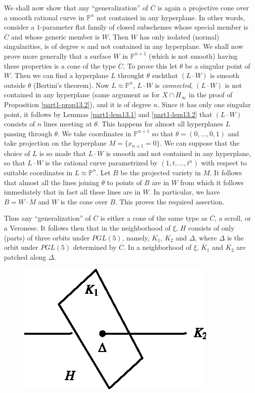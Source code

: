 {We shall now show that any ``generalization'' of $\overline{C}$ is again a
projective cone over a smooth rational curve in $\mathbb{P}^{n}$ not
contained in any hyperplane. In other words, consider a $1$-parameter
flat family of closed subschemes whose special member is
$\overline{C}$ and whose generic member is $W$. Then $W$ has only
isolated (normal) singularities, is of degree $n$ and not contained in
any hyperplane. We shall now prove more generally that a surface $W$
in $\mathbb{P}^{n+1}$ (which is not smooth) having these properties is
a cone of the type $\overline{C}$. To prove this let $\theta$ be a
singular point of $W$. Then we can find a hyperplane $L$ throught
$\theta$ such\pageoriginale that $(L\cdot W)$ is smooth outside
$\theta$ (Bertini's theorem). Now $L\approx \mathbb{P}^{n}$, $L\cdot
W$ is {\em connected}, $(L\cdot W)$ is not contained in any hyperplane
(same argument as for $X\cap H_{\infty}$ in the proof of Proposition
\ref{part1-prop13.2}), and it is of degree $n$. Since it has only one
singular point, it follows by Lemmas \ref{part1-lem13.1} and
\ref{part1-lem13.2} that $(L\cdot W)$ consists of $n$ lines meeting at
$\theta$. This happens for almost all hyperplanes $L$ passing through
$\theta$. We take coordinates in $\mathbb{P}^{n+1}$ so that
$\theta=(0,\ldots,0,1)$ and take projection on the hyperplane
$M=\{x_{n+1}=0\}$. We can suppose that the choice of $L$ is so made
that $L\cdot W$ is smooth and not contained in any hyperplane, so that
$L\cdot W$ is the rational curve parametrized by $(1,t,\ldots,t^{n})$
with respect to suitable coordinates in $L\approx \mathbb{P}^{n}$. Let
$B$ be the projected variety in $M$. It follows that almost all the
lines joining $\theta$ to points of $B$ are in $W$ from which it
follows immediately that in fact all these lines are in $W$. In
particular, we have $B=W\cdot M$ and $W$ is the cone over $B$. This
proves the required assertion.

Thus any ``generalization'' of $\overline{C}$ is either a cone of the
same type as $\overline{C}$, a scroll, or a Veronese. It follows then
that in the neighborhood of $\xi$, $H$ consists of only (parts) of
three orbits under $PGL(5)$, namely, $K_{1}$, $K_{2}$ and $\Delta$,
where $\Delta$ is the orbit under $PGL(5)$ determined by
$\overline{C}$. In a neighborhood of $\xi$, $\overline{K}_{1}$ and
$\overline{K}_{2}$ are patched along $\Delta$.
\begin{figure}[H]
\centering
\includegraphics{figure/fig-a.eps}
\end{figure}

}
